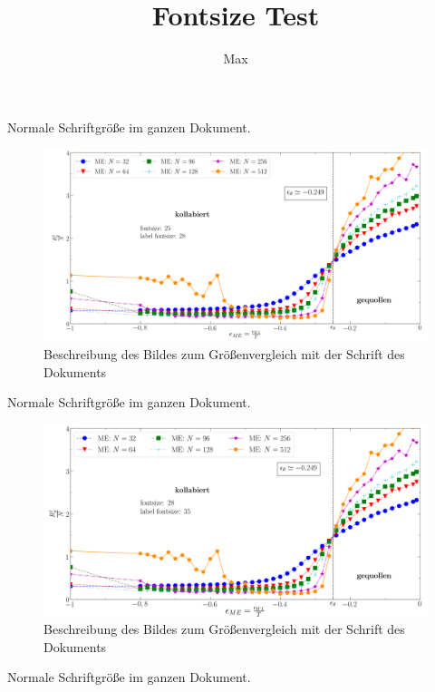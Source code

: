 
\usepackage{graphicx,newfloat}
\usepackage[format=hang]{caption}
\usepackage{enumitem}
\usepackage[most]{tcolorbox}
\newcommand*\diff{\mathop{}\!\mathrm{d}}        %
\newcommand*\Diff[1]{\mathop{}\!\mathrm{d^#1}}  %
\usepackage{bigints}                            %
\usepackage{float}




\title{Fontsize Test}
\author{Max}
\maketitle
Normale Schriftgröße im ganzen Dokument.
\begin{figure}[H]
\includegraphics[width=\textwidth]{png_25_28.png}
\caption{Beschreibung des Bildes zum Größenvergleich mit der Schrift des Dokuments}
\end{figure}
Normale Schriftgröße im ganzen Dokument.
\begin{figure}[H]
\includegraphics[width=\textwidth]{png_28_28.png}
\caption{Beschreibung des Bildes zum Größenvergleich mit der Schrift des Dokuments}
\end{figure}
Normale Schriftgröße im ganzen Dokument.

